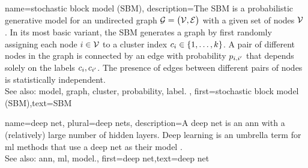 {name={stochastic block model (SBM)},
	description={The SBM is a 
		probabilistic generative \gls{model} for an undirected \gls{graph} $\mathcal{G} = \big( \mathcal{V}, \mathcal{E} \big)$ 
		with a given set of nodes $\mathcal{V}$ \cite{AbbeSBM2018}. In its most basic variant, 
		the SBM generates a \gls{graph} by first randomly assigning each node $i \in \mathcal{V}$ to 
		a \gls{cluster} index $c_{i} \in \{1,\ldots,k\}$. A pair of different nodes in the 
		\gls{graph} is connected by an edge with \gls{probability} $p_{i,i'}$ that depends 
		solely on the \glspl{label} $c_{i}, c_{i'}$. 
		The presence of edges between different pairs of 
		nodes is statistically independent.
					\\ 
		See also: \gls{model}, \gls{graph}, \gls{cluster}, \gls{probability}, \gls{label}. },
	first={stochastic block model (SBM)},text={SBM} 
}

{name={deep net}, plural={deep nets},
	description={A deep net is an \gls{ann} with a (relatively) large number of 
	hidden layers. Deep learning is an umbrella term for \gls{ml} methods that use a deep 
	net as their \gls{model} \cite{Goodfellow-et-al-2016}.
				\\ 
		See also: \gls{ann}, \gls{ml}, \gls{model}.},
	first={deep net},text={deep net} 
}

\newcommand{\gaussiancenter}{3}

